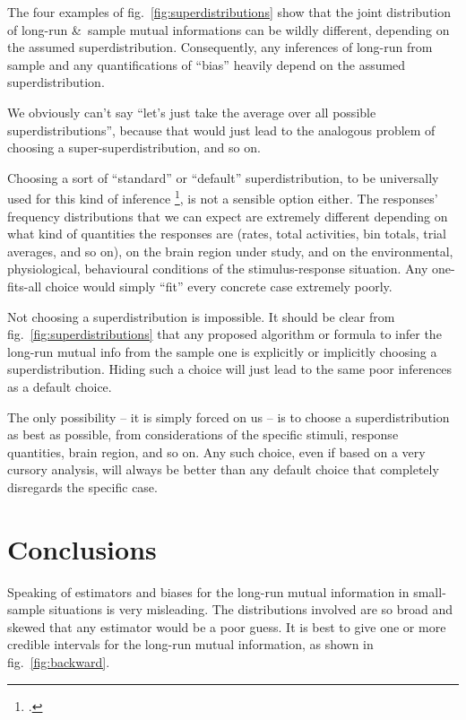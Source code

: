 \documentclass[\ifafour a4paper,12pt,\else a5paper,10pt,\fi%
onecolumn,oneside,article,%
british%
]{memoir}
\theoremstyle{remark}
\theoremstyle{innote}
\newcommand*{\citep}{\footcites}
\newcommand*{\amp}{\&}
\renewcommand*{\|}[1][]{\nonscript\,#1\vert\nonscript\;\mathopen{}}
\newcommand*{\fig}{fig.}%
\newcommand*{\cf}{{cf.}}
\begin{document}
The four examples of \fig~\ref{fig:superdistributions} show that the joint
distribution of long-run \amp\ sample mutual informations can be wildly
different, depending on the assumed superdistribution. Consequently, any
inferences of long-run from sample and any quantifications of
\enquote{bias} heavily depend on the assumed superdistribution.

\medskip

We obviously can't say \enquote{let's just take the average over all
  possible superdistributions}, because that would just lead to the
analogous problem of choosing a super-superdistribution, and so on.

Choosing a sort of \enquote{standard} or \enquote{default}
superdistribution, to be universally used for this kind of inference
\citep[\cf][]{nemenmanetal2004}, is not a sensible option either. The
responses' frequency distributions that we can expect are extremely
different depending on what kind of quantities the responses are (rates,
total activities, bin totals, trial averages, and so on), on the brain
region under study, and on the environmental, physiological, behavioural
conditions of the stimulus-response situation. Any one-fits-all choice
would simply \enquote{fit} every concrete case extremely poorly.

Not choosing a superdistribution is impossible. It should be clear from
\fig~\ref{fig:superdistributions} that any proposed algorithm or formula to
infer the long-run mutual info from the sample one is explicitly or
implicitly choosing a superdistribution. Hiding such a choice will just
lead to the same poor inferences as a default choice.

The only possibility -- it is simply forced on us -- is to choose a
superdistribution as best as possible, from considerations of the specific
stimuli, response quantities, brain region, and so on. Any such choice,
even if based on a very cursory analysis, will always be better than any
default choice that completely disregards the specific case.

\section{Conclusions}
\label{sec:conclusions}

Speaking of estimators and biases for the long-run mutual information in
small-sample situations is very misleading. The distributions involved are
so broad and skewed that any estimator would be a poor guess. It is best to
give one or more credible intervals for the long-run mutual information, as
shown in \fig~\ref{fig:backward}.
\end{document}
